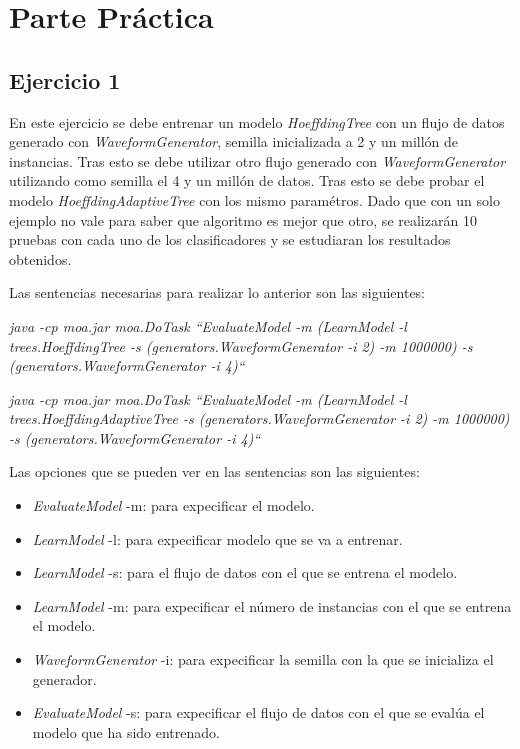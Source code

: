 \chapter{Parte Práctica}
\section{Ejercicio 1}
En este ejercicio se debe entrenar un modelo \textit{HoeffdingTree} con un flujo de datos generado con \textit{WaveformGenerator}, semilla inicializada a 2 y un millón de instancias. Tras esto se debe utilizar otro flujo generado con \textit{WaveformGenerator} utilizando como semilla el 4 y un millón de datos. Tras esto se debe probar el modelo \textit{HoeffdingAdaptiveTree} con los mismo paramétros. Dado que con un solo ejemplo no vale para saber que algoritmo es mejor que otro, se realizarán 10 pruebas con cada uno de los clasificadores y se estudiaran los resultados obtenidos.

Las sentencias necesarias para realizar lo anterior son las siguientes:
\vspace{0.06in}

\textit{java -cp moa.jar moa.DoTask ``EvaluateModel -m
(LearnModel -l trees.HoeffdingTree -s
(generators.WaveformGenerator -i 2) -m 1000000)
-s (generators.WaveformGenerator -i 4)``}

\textit{java -cp moa.jar moa.DoTask ``EvaluateModel -m
(LearnModel -l trees.HoeffdingAdaptiveTree -s
(generators.WaveformGenerator -i 2) -m 1000000)
-s (generators.WaveformGenerator -i 4)``}
\vspace{0.06in}


Las opciones que se pueden ver en las sentencias son las siguientes:
\begin{itemize}
	\item \textit{EvaluateModel} -m: para expecificar el modelo.
	\item \textit{LearnModel} -l: para expecificar modelo que se va a entrenar.
	\item \textit{LearnModel} -s: para el flujo de datos con el que se entrena el modelo.
	\item \textit{LearnModel} -m: para expecificar el número de instancias con el que se entrena el modelo.
	\item \textit{WaveformGenerator} -i: para expecificar la semilla con la que se inicializa el generador.
	\item \textit{EvaluateModel} -s: para expecificar el flujo de datos con el que se evalúa el modelo que ha sido entrenado.
\end{itemize}

